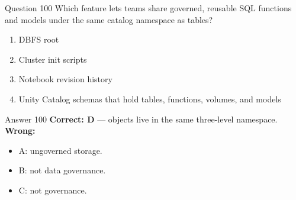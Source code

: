 \documentclass[aspectratio=169,11pt]{beamer}
\begin{document}
\begin{frame}{Question 100}
Which feature lets teams share governed, reusable SQL functions and models under the same catalog namespace as tables?
\begin{enumerate}[label=\Alph*.]
\item DBFS root
\item Cluster init scripts
\item Notebook revision history
\item Unity Catalog schemas that hold tables, functions, volumes, and models
\end{enumerate}
\end{frame}
\begin{frame}{Answer 100}
\textbf{Correct: D} --- objects live in the same three-level namespace.\\
\vspace{0.5em}
\textbf{Wrong:}
\begin{itemize}
\item A: ungoverned storage.
\item B: not data governance.
\item C: not governance.
\end{itemize}
\end{frame}
\end{document}
